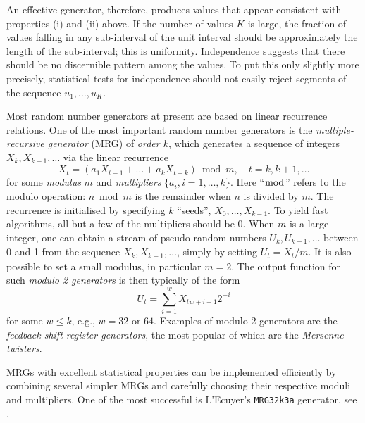 An effective generator, therefore, produces values that appear consistent with properties (i) and (ii) above. If the number of values $K$ is large, the fraction of values falling in any sub-interval of the unit interval should be approximately the length of the sub-interval; this is uniformity. Independence suggests that there should be no discernible pattern among the values. To put this only slightly more precisely, statistical tests for independence should not easily reject segments of the sequence $u_1, \dots, u_K$.

Most random number generators at present are based on linear recurrence relations. One of the most important random number generators is the \textit{multiple-recursive generator} (MRG) of \textit{order $k$}, which generates a sequence of integers $X_k, X_{k+1}, \dots$ via the linear recurrence
\begin{equation} \label{eq:MRGRecurrence}
	X_t = (a_1 X_{t-1} + \dots + a_k X_{t-k}) \bmod m, \quad t = k, k+1, \dots
\end{equation}
for some \textit{modulus} $m$ and \textit{multipliers} $\{a_i, i = 1, \dots, k\}$. Here ``$\bmod$'' refers to the modulo operation: $n \bmod m$ is the remainder when $n$ is divided by $m$. The recurrence is initialised by specifying $k$ ``seeds'', $X_0, \dots, X_{k-1}$. To yield fast algorithms, all but a few of the multipliers should be 0. When $m$ is a large integer, one can obtain a stream of pseudo-random numbers $U_k, U_{k+1}, \dots$ between 0 and 1 from the sequence $X_k, X_{k+1}, \dots$, simply by setting $U_t = X_t/m$. It is also possible to set a small modulus, in particular $m=2$. The output function for such \textit{modulo 2 generators} is then typically of the form
\begin{equation} \label{eq:Modulo2OutputFunction}
	U_t = \sum_{i=1}^w X_{tw+i-1} 2^{-i}
\end{equation}
for some $w \le k$, e.g., $w=32$ or $64$. Examples of modulo 2 generators are the \textit{feedback shift register generators}, the most popular of which are the \textit{Mersenne twisters}.



MRGs with excellent statistical properties can be implemented efficiently by combining several simpler MRGs and carefully choosing their respective moduli and multipliers. One of the most successful is L'Ecuyer's \texttt{MRG32k3a} generator, see \citep{lecuyerGoodParametersImplementations1999}.

